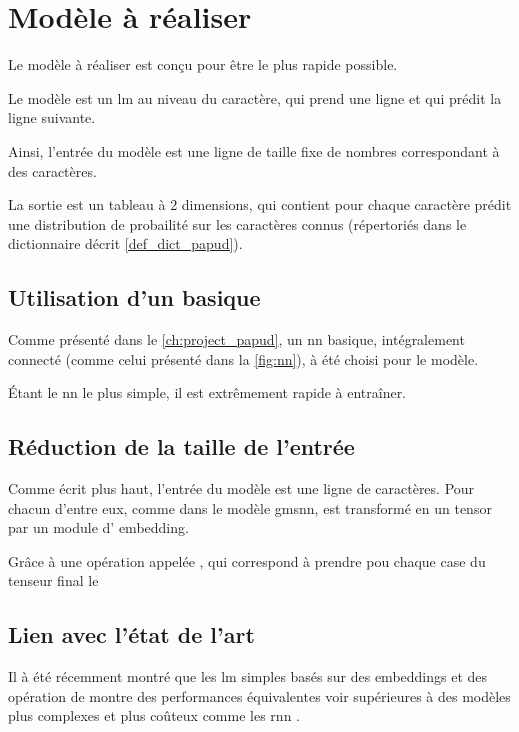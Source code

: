 \chapter{Modèle à réaliser}\label{ch:papud_model}
Le modèle à réaliser est conçu pour être le plus rapide possible.

Le modèle est un \gls{lm} au niveau du caractère, qui prend une ligne et qui prédit la ligne suivante.

Ainsi, l'entrée du modèle est une ligne de taille fixe de nombres correspondant à des caractères.

La sortie est un tableau à 2 dimensions, qui contient pour chaque caractère prédit une distribution de probailité sur les caractères connus (répertoriés dans le dictionnaire décrit \autoref{def_dict_papud}).


\section{Utilisation d'un  basique}
Comme présenté dans le \autoref{ch:project_papud}, un \gls{nn} basique, intégralement connecté (comme celui présenté dans la \autoref{fig:nn}), à été choisi pour le modèle.

Étant le \gls{nn} le plus simple, il est extrêmement rapide à entraîner.

\section{Réduction de la taille de l'entrée}
Comme écrit plus haut, l'entrée du modèle est une ligne de caractères.
Pour chacun d'entre eux, comme dans le modèle \gls{gmsnn}, est transformé en un \gls{tensor} par un module d' \gls{embedding}. %

Grâce à une opération appelée \og {} \fg{}, qui correspond à prendre pou chaque case du tenseur final le 

\section{Lien avec l'état de l'art}
Il à été récemment montré que les \gls{lm} simples basés sur des  \glspl{embedding} et des opération de 
montre des performances équivalentes voir supérieures à des modèles plus complexes et plus coûteux comme les \gls{rnn} \autocite{}. %


%
%
%
%
%
